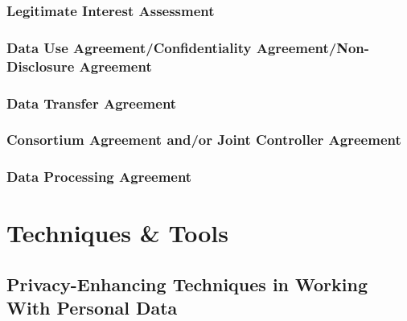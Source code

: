 \documentclass[
]{book}
\begin{document}
\hypertarget{legitimate-interest-assessment}{%
\section*{Legitimate Interest Assessment}\label{legitimate-interest-assessment}}

\hypertarget{data-use-agreementconfidentiality-agreementnon-disclosure-agreement}{%
\section{Data Use Agreement/Confidentiality Agreement/Non-Disclosure Agreement}\label{data-use-agreementconfidentiality-agreementnon-disclosure-agreement}}

\hypertarget{data-transfer-agreement}{%
\section*{Data Transfer Agreement}\label{data-transfer-agreement}}

\hypertarget{consortium-agreement-andor-joint-controller-agreement}{%
\section{Consortium Agreement and/or Joint Controller Agreement}\label{consortium-agreement-andor-joint-controller-agreement}}

\hypertarget{data-processing-agreement}{%
\section*{Data Processing Agreement}\label{data-processing-agreement}}

\hypertarget{part-techniques-tools}{%
\part{Techniques \& Tools}\label{part-techniques-tools}}

\hypertarget{privacy-enchancing-techniques}{%
\chapter{Privacy-Enhancing Techniques in Working With Personal Data}\label{privacy-enchancing-techniques}}
\end{document}
